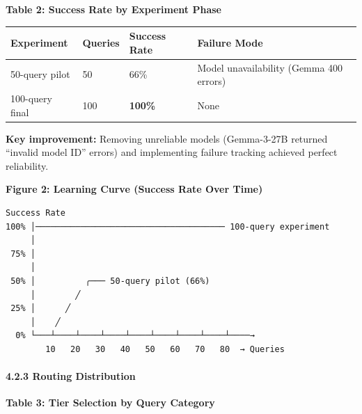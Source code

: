 \documentclass[
  11pt,
]{article}
\begin{document}
\textbf{Table 2: Success Rate by Experiment Phase}

\begin{longtable}[]{@{}llll@{}}
\toprule
Experiment & Queries & Success Rate & Failure Mode \\
\midrule
\endhead
50-query pilot & 50 & 66\% & Model unavailability (Gemma 400 errors) \\
100-query final & 100 & \textbf{100\%} & None \\
\bottomrule
\end{longtable}

\textbf{Key improvement:} Removing unreliable models (Gemma-3-27B
returned ``invalid model ID'' errors) and implementing failure tracking
achieved perfect reliability.

\textbf{Figure 2: Learning Curve (Success Rate Over Time)}

\begin{verbatim}
Success Rate
100% │────────────────────────────────────── 100-query experiment
     │
 75% │
     │
 50% │          ╭─── 50-query pilot (66%)
     │        ╱
 25% │      ╱
     │    ╱
  0% └───┴────┴────┴────┴────┴────┴────┴────┴────→
        10   20   30   40   50   60   70   80  → Queries
\end{verbatim}

\hypertarget{routing-distribution-1}{%
\paragraph{4.2.3 Routing Distribution}\label{routing-distribution-1}}

\textbf{Table 3: Tier Selection by Query Category}
\end{document}

